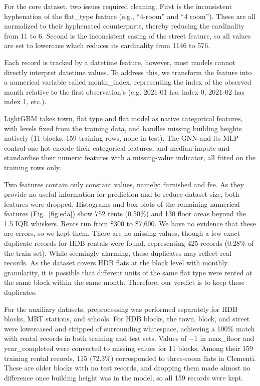 For the core dataset, two issues required cleaning. First is the inconsistent hyphenation of the flat\_type feature (e.g., “4-room” and “4 room”). These are all normalized to their hyphenated counterparts, thereby reducing the cardinality from 11 to 6. Second is the inconsistent casing of the street feature, so all values are set to lowercase which reduces its cardinality from 1146 to 576.

Each record is tracked by a datetime feature, however, most models cannot directly interpret datetime values. To address this, we transform the feature into a numerical variable called month\_index, representing the index of the observed month relative to the first observation's (e.g. 2021-01 has index 0, 2021-02 has index 1, etc.).

LightGBM takes town, flat type and flat model as native categorical features, with levels fixed from the training data, and handles missing building heights natively (11 blocks, 159 training rows, none in test). The GNN and its MLP control one-hot encode their categorical features, and median-impute and standardise their numeric features with a missing-value indicator, all fitted on the training rows only.

Two features contain only constant values, namely: furnished and fee. As they provide no useful information for prediction and to reduce dataset size, both features were dropped. Histograms and box plots of the remaining numerical features (Fig.~\ref{fig:eda}) show 752 rents (0.50\%) and 130 floor areas beyond the 1.5 IQR whiskers. Rents run from \$300 to \$7,600. We have no evidence that these are errors, so we kept them. There are no missing values, though a few exact duplicate records for HDB rentals were found, representing 425 records (0.28\% of the train set). While seemingly alarming, these duplicates may reflect real records. As the dataset covers HDB flats at the block level with monthly granularity, it is possible that different units of the same flat type were rented at the same block within the same month. Therefore, our verdict is to keep these duplicates.

For the auxiliary datasets, preprocessing was performed separately for HDB blocks, MRT stations, and schools. For HDB blocks, the town, block, and street were lowercased and stripped of surrounding whitespace, achieving a 100\% match with rental records in both training and test sets. Values of $-1$ in max\_floor and year\_completed were converted to missing values for 11 blocks. Among their 159 training rental records, 115 (72.3\%) corresponded to three-room flats in Clementi. These are older blocks with no test records, and dropping them made almost no difference once building height was in the model, so all 159 records were kept. 


